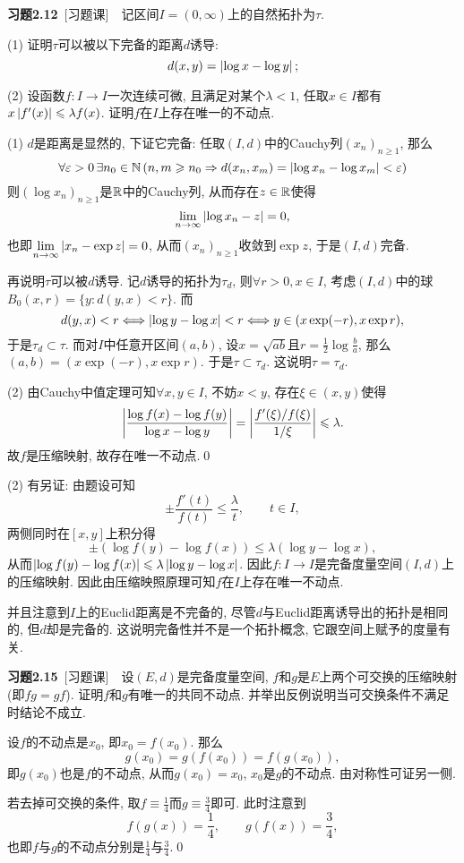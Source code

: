 	\textbf{习题2.12}\ [习题课]\ \ 记区间$ I=(0,\infty) $上的自然拓扑为$ \tau $.
	
	(1) 证明$ \tau $可以被以下完备的距离$ d $诱导:
	\[
	d(x,y)=\left| \log x-\log y \right| ;
	\]
	
	(2) 设函数$ f : I\to I $一次连续可微, 且满足对某个$ \lambda<1 $, 任取$ x\in I $都有$ x\left| f'(x) \right| \leqslant\lambda f(x) $. 证明$ f $在$ I $上存在唯一的不动点.
	\begin{Proof}
	(1) $ d $是距离是显然的, 下证它完备: 任取$ (I,d) $中的Cauchy列$ (x_n)_{n\geqslant 1} $, 那么
	\[
	\forall\varepsilon>0\,\exists n_0\in\mathbb{N}\,(n,m\geqslant n_0\Rightarrow d(x_n,x_m)=\left| \log{x_n}-\log{x_m} \right| <\varepsilon)
	\]
	则$ (\log x_n)_{n\geqslant 1} $是$ \mathbb{R} $中的Cauchy列, 从而存在$ z\in\mathbb{R} $使得
	\[
	\lim_{n\to\infty}\left| \log x_n-z \right| =0,
	\]
	也即$ \lim\limits_{n\to\infty}\left| x_n-\exp z \right| =0 $, 从而$ (x_n)_{n\geqslant 1} $收敛到$ \exp z $, 于是$ (I,d) $完备.
	
	再说明$ \tau $可以被$ d $诱导. 记$ d $诱导的拓扑为$ \tau_d $, 则$ \forall r>0,x\in I $, 考虑$ (I,d) $中的球$ B_0(x,r)=\{ y : d(y,x)<r \} $. 而
	\[
	d(y,x)<r\Longleftrightarrow\left| \log y-\log x \right| <r\Longleftrightarrow y\in(x\exp (-r),x\exp r),
	\]
	于是$ \tau_d\subset \tau $. 而对$ I $中任意开区间$ (a,b) $, 设$ x=\sqrt{ab} $且$ r=\frac{1}{2}\log\frac{b}{a} $, 那么$ (a,b)=(x\exp(-r),x\exp r) $. 于是$ \tau\subset\tau_d $. 这说明$ \tau=\tau_d $.
	
	(2) 由Cauchy中值定理可知$ \forall x,y\in I $, 不妨$ x<y $, 存在$ \xi\in(x,y) $使得
	\[
	\left| \frac{\log f(x)-\log f(y)}{\log x-\log y} \right| =\left| \frac{f'(\xi)/f(\xi)}{1/\xi} \right| \leqslant\lambda.
	\]
	故$ f $是压缩映射, 故存在唯一不动点.\qed
	\end{Proof}
	\begin{Remark}
	(2) 有另证: 由题设可知
	\[
	\pm\frac{f'(t)}{f(t)}\leqslant\frac{\lambda}{t},\qquad t\in I,
	\]
	两侧同时在$ [x,y] $上积分得
	\[
	\pm(\log f(y)-\log f(x))\leqslant\lambda(\log y-\log x),
	\]
	从而$ \left| \log f(y)-\log f(x) \right| \leqslant\lambda\left| \log y-\log x \right|  $. 因此$ f : I\to I $是完备度量空间$ (I,d) $上的压缩映射. 因此由压缩映照原理可知$ f $在$ I $上存在唯一不动点.
	
	并且注意到$ I $上的Euclid距离是不完备的, 尽管$ d $与Euclid距离诱导出的拓扑是相同的, 但$ d $却是完备的. 这说明完备性并不是一个拓扑概念, 它跟空间上赋予的度量有关.
	\end{Remark}
	
	\textbf{习题2.15}\ [习题课]\ \ 设$ (E,d) $是完备度量空间, $ f $和$ g $是$ E $上两个可交换的压缩映射(即$ fg=gf $). 证明$ f $和$ g $有唯一的共同不动点. 并举出反例说明当可交换条件不满足时结论不成立.
	\begin{Proof}
	设$ f $的不动点是$ x_0 $, 即$ x_0=f(x_0) $. 那么
	\[
	g(x_0)=g(f(x_0))=f(g(x_0)),
	\]
	即$ g(x_0) $也是$ f $的不动点, 从而$ g(x_0)=x_0 $, $ x_0 $是$ g $的不动点. 由对称性可证另一侧.
	
	若去掉可交换的条件, 取$ f\equiv\frac{1}{4} $而$ g\equiv\frac{3}{4} $即可. 此时注意到
	\[
	f(g(x))=\frac{1}{4},\qquad g(f(x))=\frac{3}{4},
	\]
	也即$ f $与$ g $的不动点分别是$ \frac{1}{4} $与$ \frac{3}{4} $.\qed
	\end{Proof}
	
